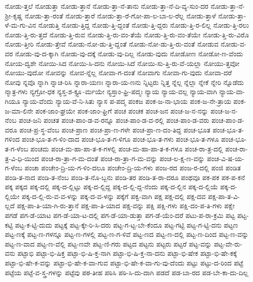 {ನೋಡು-ತ್ತಲೆ
ನೋಡುತ್ತಾ
ನೋಡು-ತ್ತಾನೆ
ನೋಡು-ತ್ತಾ-ನೆ-ತಾನು
ನೋಡು-ತ್ತಾ-ನೆ-ದಿ-ವ್ಯ-ಸುಂ-ದರ
ನೋಡು-ತ್ತಾ-ನೆ-ಶ್ರೀ-ಕೃಷ್ಣ
ನೋಡು-ತ್ತಾ-ರಂತೆ
ನೋಡು-ತ್ತಾರೆ
ನೋಡು-ತ್ತಾ-ರೆ-ಗೋ-ಪಾ-ಲ-ಬಾ-ಲ-ರೆಲ್ಲ
ನೋಡು-ತ್ತಾಳೆ
ನೋಡು-ತ್ತಾ-ಳೆ-ಮ-ಗು-ವಿನ
ನೋಡುತ್ತಿ
ನೋಡು-ತ್ತಿದ್ದ
ನೋಡು-ತ್ತಿ-ದ್ದಂತೆ
ನೋಡು-ತ್ತಿ-ದ್ದರು
ನೋಡು-ತ್ತಿ-ರ-ಲಿಲ್ಲ
ನೋಡು-ತ್ತಿ-ರಲು
ನೋಡು-ತ್ತಿ-ರು-ತ್ತದೆ
ನೋಡು-ತ್ತಿ-ರುವ
ನೋಡು-ತ್ತಿ-ರು-ವಂ-ತೆಯೆ
ನೋಡು-ತ್ತಿ-ರು-ವಂ-ತೆಯೇ
ನೋಡು-ತ್ತಿ-ರು-ವಿರೊ
ನೋಡು-ತ್ತೀರಿ
ನೋಡು-ತ್ತೇವೆ
ನೋಡು-ನೋ-ಡು-ತ್ತಿ-ದ್ದಂತೆ
ನೋಡು-ನೋ-ಡು-ತ್ತಿ-ರು-ವಂತೆ
ನೋಡುವ
ನೋಡು-ವ-ವರ
ನೋಡು-ವು-ದ-ಕ್ಕಾಗಿ
ನೋಡು-ವು-ದಕ್ಕೆ
ನೋಡು-ವು-ದಿಲ್ಲ
ನೋಡು-ವುದು
ನೋಡೋಣ
ನೋಡೋ-ಣ-ವೆಂದು
ನೋಯ-ದ್ವಶೇ
ನೋಯಿ-ಸಿದ
ನೋಯಿ-ಸಿ-ದನು
ನೋಯಿ-ಸಿದೆ
ನೋಯಿ-ಸು-ತ್ತಿ-ರು-ವೆ-ಯಲ್ಲಾ
ನೋಯು-ತ್ತವೋ
ನೋಯು-ವುದೋ
ನೋವನ್ನು
ನೋವ-ನ್ನೆಲ್ಲ
ನೋವಾ-ಗ-ದಂತೆ
ನೋವಾಗು
ನೋವಾ-ಗು-ವುದು
ನೋವಾ-ದರೆ
ನೋವು
ನ್ನವೊ
ನ್ನಾಗಿ
ನ್ನಾಚ-ರಿಸಿ
ನ್ನಾರಾ-ಯಣಃ
ನ್ನಾರಾ-ಯ-ಣನು
ನ್ನಿಟ್ಟರು
ನ್ನಿತ್ತ
ನ್ನೆಲ್ಲ
ನ್ನೆಲ್ಲಾ
ನ್ನೇಕೆ
ನ್ನೇರಿ
ನ್ನೊಡೆದು
ನ್ಮಾತ್ರ-ಗಳು
ನ್ಯಗ್ರೋ-ಧಕ
ನ್ಯಸ್ತ-ಶ-ಕ್ತ್ಯೂ-ರ್ಮಯೇ
ನ್ಯಸ್ತಾಂ-ಘ್ರಿ-ಪದ್ಮಃ
ನ್ಯಾಯ
ನ್ಯಾಯ-ವಲ್ಲ
ನ್ಯಾಯ-ವಾಗಿ
ನ್ಯಾಯ-ವಾ-ಗಿಯೂ
ನ್ಯಾಯ-ವೆಂದು
ನ್ಯಾಯ-ವೆ-ನಿ-ಸಿತು
ನ್ಯಾಸ
ಪ-ಪದ್ಮ
ಪಂಕಜ
ಪಂಕ-ಜ-ನಾ-ಭಾಯ
ಪಂಕ-ಜ-ನೇ-ತ್ರಾಯ
ಪಂಕ-ಜ-ಮಾ-ಲಿನೇ
ಪಂಕ-ಜಾಂ-ಘ್ರಯೇ
ಪಂಕ-ಜಾಂ-ಘ್ರಿಗೆ
ಪಂಚ
ಪಂಚಕ
ಪಂಚ-ಜನ
ಪಂಚ-ಜ-ನ-ನನ್ನು
ಪಂಚ-ಜ-ನ-ನೆಂಬ
ಪಂಚ-ಜನಿ
ಪಂಚತ
ಪಂಚ-ಪಾಂ-ಡ-ವ-ರನ್ನೂ
ಪಂಚ-ಪಾಂ-ಡ-ವ-ರಲ್ಲಿ
ಪಂಚ-ಪಾಂ-ಡ-ವರು
ಪಂಚ-ಪಾಂ-ಡ-ವರೂ
ಪಂಚ-ಪ್ರ-ಸ್ಥ-ವೆಂಬ
ಪಂಚ-ಪ್ರಾಣ
ಪಂಚ-ಪ್ರಾ-ಣ-ಗಳೇ
ಪಂಚ-ಪ್ರಾ-ಣ-ದಂ-ತಿದ್ದ
ಪಂಚ-ಭೂತ
ಪಂಚ-ಭೂ-ತ-ಗಳಿಂದ
ಪಂಚ-ಭೂ-ತ-ಗ-ಳಿಂ-ದಾದ
ಪಂಚ-ಭೂ-ತ-ಗ-ಳಿಗೂ
ಪಂಚ-ಭೂ-ತ-ಗಳು
ಪಂಚ-ಭೂ-ತ-ಗಳೂ
ಪಂಚ-ಭೂ-ತ-ಗ-ಳೆಂಬ
ಪಂಚಮ
ಪಂಚ-ಮ-ಹಾ-ಪಾ-ತ-ಕ-ಗಳಲ್ಲಿ
ಪಂಚ-ಮ-ಹಾ-ಪಾ-ತ-ಕ-ಗಳೂ
ಪಂಚ-ರಾ-ತ್ರ-ದಲ್ಲಿ
ಪಂಚ-ರಾ-ತ್ರ-ವಿ-ಧಿ-ಯಿಂದ
ಪಂಚ-ರಾ-ತ್ರಾ-ಗ-ಮ-ದಂತೆ
ಪಂಚ-ರಾ-ತ್ರಾ-ಗ-ಮ-ವನ್ನು
ಪಂಚ-ಲ-ಕ್ಷ-ಣ-ವನ್ನು
ಪಂಚ-ವಿ-ಷ-ಯ-ಗ-ಳೆಂಬ
ಪಂಚಾ
ಪಂಚೇಂ-ದ್ರಿ-ಯ-ಗ-ಳಿಂ-ದಲೂ
ಪಂಚೇಂ-ದ್ರಿ-ಯ-ಗಳು
ಪಂಜ-ರದ
ಪಂಜ-ರ-ದಲ್ಲಿ
ಪಂಜಿ
ಪಂಡಿತ
ಪಂಡಿ-ತ-ನಾದ
ಪಂಡಿ-ತ-ನೆಂಬ
ಪಂಡಿ-ತ-ನೊ-ಬ್ಬನು
ಪಂಡಿ-ತರ
ಪಂಡಿ-ತ-ರಾ-ದರೂ
ಪಂಥವೂ
ಪಕ-ಪಕ
ಪಕ-ಪ-ಕನೆ
ಪಕ್ಕ
ಪಕ್ಕದ
ಪಕ್ಕ-ದಲ್ಲಿ
ಪಕ್ಕ-ದ-ಲ್ಲಿಟ್ಟು
ಪಕ್ಕ-ದ-ಲ್ಲಿದ್ದ
ಪಕ್ಕ-ದ-ಲ್ಲಿ-ದ್ದ-ನೆಂದು
ಪಕ್ಕ-ದ-ಲ್ಲಿನ
ಪಕ್ಕ-ದ-ಲ್ಲಿಯೆ
ಪಕ್ಕ-ದ-ಲ್ಲಿಯೇ
ಪಕ್ಕ-ದ-ಲ್ಲಿ-ರು-ವ-ವ-ಳನ್ನು
ಪಕ್ಕ-ದ-ವ-ಳನ್ನು
ಪಕ್ಕೆಗೆ
ಪಕ್ವ-ವಾಗಿ
ಪಕ್ಷ
ಪಕ್ಷ-ದಲ್ಲಿ
ಪಕ್ಷ-ದವ
ಪಕ್ಷ-ಪಾ-ತ-ವಿ-ಲ್ಲದೆ
ಪಕ್ಷ-ಪಾ-ತಿ-ಯಾ-ಗಿ-ರು-ತ್ತಾನೆ
ಪಕ್ಷ-ಪಾ-ತಿ-ಯಾದ
ಪಕ್ಷ-ವನ್ನು
ಪಕ್ಷಿ
ಪಕ್ಷಿ-ಗಳು
ಪಕ್ಷಿ-ದಂ-ಪ-ತಿ-ಗಳು
ಪಕ್ಷೇ
ಪಗಡೆ
ಪಗ-ಡೆ-ಯಾಟ
ಪಗ-ಡೆ-ಯಾ-ಟ-ದಲ್ಲಿ
ಪಗ-ಡೆ-ಯಾ-ಡುತ್ತಾ
ಪಗ-ಡೆ-ಯೆಂ-ದರೆ
ಪಟು-ಪ-ರಾ-ಕ್ರಮಿ
ಪಟ್ಟ
ಪಟ್ಟ-ಕಟ್ಟಿ
ಪಟ್ಟ-ಕ-ಟ್ಟಿ-ದುದು
ಪಟ್ಟಕ್ಕೆ
ಪಟ್ಟ-ಕ್ಕೇ-ರಿ-ಸಿ-ದರು
ಪಟ್ಟ-ಗ-ಟ್ಟ-ಬೇ-ಕೆಂದೂ
ಪಟ್ಟ-ಗಟ್ಟಿ
ಪಟ್ಟ-ಗ-ಟ್ಟಿ-ದನು
ಪಟ್ಟಣ
ಪಟ್ಟ-ಣಕ್ಕೆ
ಪಟ್ಟ-ಣ-ಗಳನ್ನೂ
ಪಟ್ಟ-ಣ-ಗಳಲ್ಲಿ
ಪಟ್ಟ-ಣ-ಗ-ಳಿವೆ
ಪಟ್ಟ-ಣದ
ಪಟ್ಟ-ಣ-ದಲ್ಲಿ
ಪಟ್ಟ-ಣ-ದಿಂದ
ಪಟ್ಟ-ಣ-ವನ್ನು
ಪಟ್ಟ-ಣ-ವಾದ
ಪಟ್ಟ-ಣ-ವೆಲ್ಲಿ
ಪಟ್ಟ-ಣವೇ
ಪಟ್ಟ-ಣಿ-ಗರು
ಪಟ್ಟದ
ಪಟ್ಟನು
ಪಟ್ಟರು
ಪಟ್ಟರೆ
ಪಟ್ಟ-ವನ್ನು
ಪಟ್ಟ-ವೇ-ರು-ವನು
ಪಟ್ಟಾಭಿ
ಪಟ್ಟಾ-ಭಿ-ಷಿಕ್ತ
ಪಟ್ಟಾ-ಭಿ-ಷಿ-ಕ್ತ-ನಾಗಿ
ಪಟ್ಟಾ-ಭಿ-ಷಿ-ಕ್ತ-ನಾ-ದನು
ಪಟ್ಟಾ-ಭಿ-ಷೇಕ
ಪಟ್ಟಾ-ಭಿ-ಷೇ-ಕಕ್ಕೆ
ಪಟ್ಟಾ-ಭಿ-ಷೇ-ಕ-ವನ್ನು
ಪಟ್ಟಾ-ಭಿ-ಷೇ-ಕ-ವಾ-ಗುವ
ಪಟ್ಟಾ-ಭಿ-ಷೇ-ಕ-ವಾ-ಗು-ವು-ದೆಂದು
ಪಟ್ಟು
ಪಟ್ಟು-ದ-ರಿಂದ
ಪಟ್ಟೆ
ಪಟ್ಟೆಯ
ಪಟ್ಟೆ-ವ-ಸ್ತ್ರ-ಗಳನ್ನು
ಪಟ್ಟೆವು
ಪಠ-ತೀಹ
ಪಠಿಸಿ
ಪಠಿ-ಸಿ-ದು-ದಾಗಿ
ಪಡದೆ
ಪಡ-ಬಾ-ರದ
ಪಡ-ಬೇ-ಕಾ-ದು-ದಿಲ್ಲ
}
